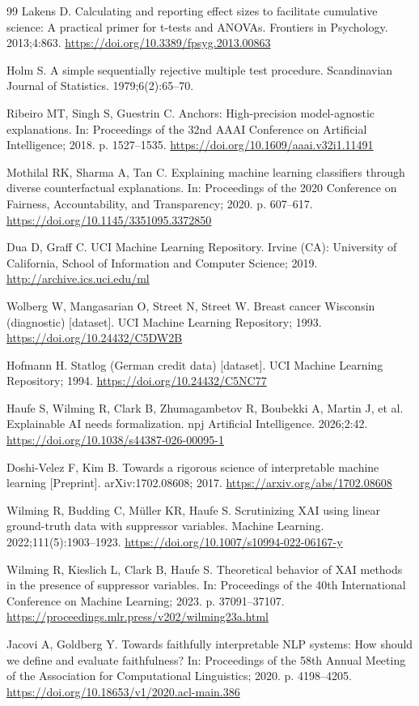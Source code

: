 \documentclass[11pt,a4paper]{article}
\begin{document}
\begin{thebibliography}{99}
Lakens D. Calculating and reporting effect sizes to facilitate cumulative
science: A practical primer for t-tests and ANOVAs. Frontiers in Psychology.
2013;4:863. \url{https://doi.org/10.3389/fpsyg.2013.00863}

Holm S. A simple sequentially rejective multiple test procedure.
Scandinavian Journal of Statistics. 1979;6(2):65--70.

Ribeiro MT, Singh S, Guestrin C. Anchors: High-precision model-agnostic
explanations. In: Proceedings of the 32nd AAAI Conference on Artificial
Intelligence; 2018. p. 1527--1535.
\url{https://doi.org/10.1609/aaai.v32i1.11491}

Mothilal RK, Sharma A, Tan C. Explaining machine learning classifiers through
diverse counterfactual explanations. In: Proceedings of the 2020 Conference
on Fairness, Accountability, and Transparency; 2020. p. 607--617.
\url{https://doi.org/10.1145/3351095.3372850}

Dua D, Graff C. UCI Machine Learning Repository. Irvine (CA): University of
California, School of Information and Computer Science; 2019.
\url{http://archive.ics.uci.edu/ml}

Wolberg W, Mangasarian O, Street N, Street W. Breast cancer Wisconsin
(diagnostic) [dataset]. UCI Machine Learning Repository; 1993.
\url{https://doi.org/10.24432/C5DW2B}

Hofmann H. Statlog (German credit data) [dataset]. UCI Machine Learning
Repository; 1994. \url{https://doi.org/10.24432/C5NC77}

Haufe S, Wilming R, Clark B, Zhumagambetov R, Boubekki A, Martin J, et al.
Explainable AI needs formalization. npj Artificial Intelligence. 2026;2:42.
\url{https://doi.org/10.1038/s44387-026-00095-1}

Doshi-Velez F, Kim B. Towards a rigorous science of interpretable machine
learning [Preprint]. arXiv:1702.08608; 2017.
\url{https://arxiv.org/abs/1702.08608}

Wilming R, Budding C, M\"{u}ller KR, Haufe S. Scrutinizing XAI using linear
ground-truth data with suppressor variables. Machine Learning.
2022;111(5):1903--1923. \url{https://doi.org/10.1007/s10994-022-06167-y}

Wilming R, Kieslich L, Clark B, Haufe S. Theoretical behavior of XAI methods
in the presence of suppressor variables. In: Proceedings of the 40th
International Conference on Machine Learning; 2023. p. 37091--37107.
\url{https://proceedings.mlr.press/v202/wilming23a.html}

Jacovi A, Goldberg Y. Towards faithfully interpretable NLP systems: How
should we define and evaluate faithfulness? In: Proceedings of the 58th
Annual Meeting of the Association for Computational Linguistics; 2020.
p. 4198--4205. \url{https://doi.org/10.18653/v1/2020.acl-main.386}

\end{thebibliography}
\end{document}
